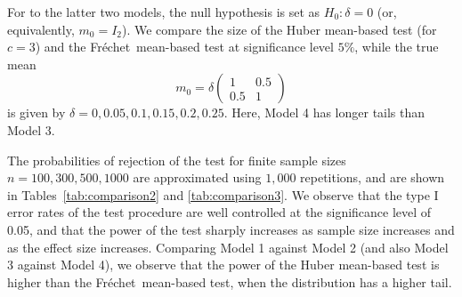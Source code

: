 \documentclass[preprint]{imsart}
\def\Frechet{Fr\'{e}chet}
\theoremstyle{plain}
\theoremstyle{remark}
\begin{document}
\begin{appendix}
For to the latter two models, the null hypothesis is set as $H_0: \delta = 0$ (or, equivalently, $m_0 = I_2$). We compare the size of the Huber mean-based test (for $c=3$) and the \Frechet\ mean-based test at significance level $5\%$, while the true mean 
$$m_0 = \delta
 \begin{pmatrix}
     1 & 0.5 \\
     0.5 & 1
 \end{pmatrix}$$
 is given by $\delta = 0, 0.05, 0.1, 0.15, 0.2, 0.25$. Here, Model 4 has longer tails than Model 3.
 
The probabilities of rejection of the test for finite sample sizes $n = 100, 300, 500, 1000$ are approximated using $1,000$ repetitions, and are shown in Tables~\ref{tab:comparison2} and \ref{tab:comparison3}. We observe that the type I error rates of the test procedure are well controlled at the significance level of 0.05, and that the power of the test sharply increases as sample size increases and as the effect size increases. Comparing Model 1 against Model 2 (and also Model 3 against Model 4), we observe that the power of the Huber mean-based test is higher than the \Frechet\ mean-based test, when the distribution has a higher tail. 

 

\end{appendix}
\end{document}
